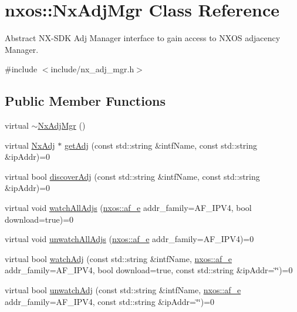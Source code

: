 \hypertarget{classnxos_1_1_nx_adj_mgr}{}\section{nxos\+:\+:Nx\+Adj\+Mgr Class Reference}
\label{classnxos_1_1_nx_adj_mgr}


Abstract N\+X-\/\+S\+DK Adj Manager interface to gain access to N\+X\+OS adjacency Manager.  




{\ttfamily \#include $<$include/nx\+\_\+adj\+\_\+mgr.\+h$>$}

\subsection*{Public Member Functions}
\begin{DoxyCompactItemize}
\item 
virtual \mbox{\hyperlink{classnxos_1_1_nx_adj_mgr_a771d390eda9cac623c3b8f9452721da5}{$\sim$\+Nx\+Adj\+Mgr}} ()
\item 
virtual \mbox{\hyperlink{classnxos_1_1_nx_adj}{Nx\+Adj}} $\ast$ \mbox{\hyperlink{classnxos_1_1_nx_adj_mgr_a0e3f6888c7c34531ff846c359195259e}{get\+Adj}} (const std\+::string \&intf\+Name, const std\+::string \&ip\+Addr)=0
\item 
virtual bool \mbox{\hyperlink{classnxos_1_1_nx_adj_mgr_a9c347e5836f0ec686fe6605a41fbef5e}{discover\+Adj}} (const std\+::string \&intf\+Name, const std\+::string \&ip\+Addr)=0
\item 
virtual void \mbox{\hyperlink{classnxos_1_1_nx_adj_mgr_a2d0bc4dfa5a270ff464238a59c613993}{watch\+All\+Adjs}} (\mbox{\hyperlink{nx__common_8h_a3a667f48b94db10aa398940dc5bf72d7}{nxos\+::af\+\_\+e}} addr\+\_\+family=A\+F\+\_\+\+I\+P\+V4, bool download=true)=0
\item 
virtual void \mbox{\hyperlink{classnxos_1_1_nx_adj_mgr_aa3a1b51dc9fd549e2ef1ac1928030883}{unwatch\+All\+Adjs}} (\mbox{\hyperlink{nx__common_8h_a3a667f48b94db10aa398940dc5bf72d7}{nxos\+::af\+\_\+e}} addr\+\_\+family=A\+F\+\_\+\+I\+P\+V4)=0
\item 
virtual bool \mbox{\hyperlink{classnxos_1_1_nx_adj_mgr_ae8bd120a58a32548d68a4327e9c26459}{watch\+Adj}} (const std\+::string \&intf\+Name, \mbox{\hyperlink{nx__common_8h_a3a667f48b94db10aa398940dc5bf72d7}{nxos\+::af\+\_\+e}} addr\+\_\+family=A\+F\+\_\+\+I\+P\+V4, bool download=true, const std\+::string \&ip\+Addr=\char`\"{}\char`\"{})=0
\item 
virtual bool \mbox{\hyperlink{classnxos_1_1_nx_adj_mgr_a70afce2634199180031767e150332687}{unwatch\+Adj}} (const std\+::string \&intf\+Name, \mbox{\hyperlink{nx__common_8h_a3a667f48b94db10aa398940dc5bf72d7}{nxos\+::af\+\_\+e}} addr\+\_\+family=A\+F\+\_\+\+I\+P\+V4, const std\+::string \&ip\+Addr=\char`\"{}\char`\"{})=0

\end{DoxyCompactItemize}
